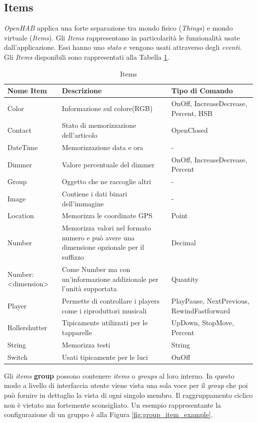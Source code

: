 \subsection{Items} {\em OpenHAB} applica una forte separazione tra mondo fisico ({\em Things}) e mondo virtuale ({\em Items}). Gli {\em Items} rappresentano in particolarità le funzionalità usate dall'applicazione. Essi hanno uno {\em stato} e vengono usati attraverso degli {\em eventi}. Gli {\em Items} disponibili sono rappresentati alla Tabella \ref{tab:items}.

\begin{table}[]
    \centering
    \begin{tabular}{l|p{5cm}|p{5cm}}
        \textbf{Nome Item} & \textbf{Descrizione} & \textbf{Tipo di Comando} \\
        \hline
        Color & Informazione sul colore(RGB) & OnOff, IncreaseDecrease, Percent, HSB\\
        Contact & Stato di memorizzazione dell'articolo & OpenClosed\\
        DateTime & Memorizzazione data e ora & -\\
        Dimmer & Valore percentuale del dimmer & OnOff, IncreaseDecrease, Percent\\
        Group & Oggetto che ne raccoglie altri & -\\
        Image & Contiene i dati binari dell'immagine & -\\
        Location & Memorizza le coordinate GPS & Point\\
        Number & Memorizza valori nel formato numero e può avere una dimensione opzionale per il suffizzo & Decimal\\
        Number:\textless dimension\textgreater & Come Number ma con un'informazione addizionale per l'unità supportata & Quantity\\
        Player & Permette di controllare i players come i riproduttori musicali & PlayPause, NextPrevious, RewindFastforward\\
        Rollershutter & Tipicamente utilizzati per le tapparelle & UpDown, StopMove, Percent\\
        String & Memorizza testi & String\\
        Switch & Usati tipicamente per le luci & OnOff
    \end{tabular}
    \caption{Items}
    \label{tab:items}
\end{table}

Gli {\em items} \textbf{group} possono contenere {\em items} o {\em groups} al loro interno. In questo modo a livello di interfaccia utente viene vista una sola voce per il {\em group} che poi può fornire in dettaglio la vista di ogni singolo membro. Il raggruppamento ciclico non è vietato ma fortemente sconsigliato. Un esempio rappresentante la configurazione di un gruppo è alla Figura \ref{fig:group_item_example}.

